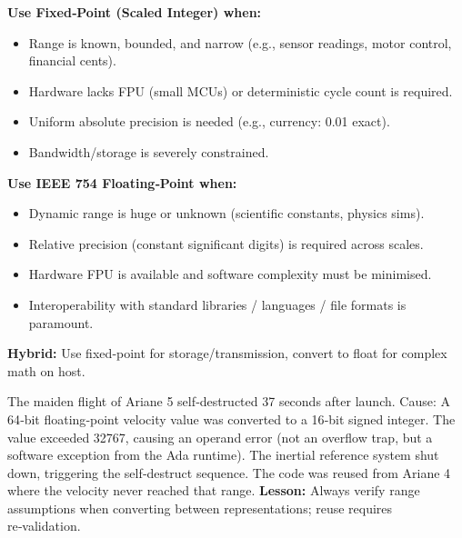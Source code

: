 \documentclass[11pt]{article}
\begin{document}
\begin{methode}
\textbf{Use Fixed‑Point (Scaled Integer) when:}
\begin{itemize}
    \item Range is known, bounded, and narrow (e.g., sensor readings, motor control, financial cents).
    \item Hardware lacks FPU (small MCUs) or deterministic cycle count is required.
    \item Uniform absolute precision is needed (e.g., currency: 0.01 exact).
    \item Bandwidth/storage is severely constrained.
\end{itemize}
\textbf{Use IEEE 754 Floating‑Point when:}
\begin{itemize}
    \item Dynamic range is huge or unknown (scientific constants, physics sims).
    \item Relative precision (constant significant digits) is required across scales.
    \item Hardware FPU is available and software complexity must be minimised.
    \item Interoperability with standard libraries / languages / file formats is paramount.
\end{itemize}
\textbf{Hybrid:} Use fixed‑point for storage/transmission, convert to float for complex math on host.
\end{methode}

\begin{savaistu}
The maiden flight of Ariane 5 self‑destructed 37 seconds after launch. Cause: A 64‑bit floating‑point velocity value was converted to a 16‑bit signed integer. The value exceeded 32767, causing an operand error (not an overflow trap, but a software exception from the Ada runtime). The inertial reference system shut down, triggering the self‑destruct sequence. The code was reused from Ariane 4 where the velocity never reached that range. \textbf{Lesson:} Always verify range assumptions when converting between representations; reuse requires re‑validation.
\end{savaistu}
\end{document}
